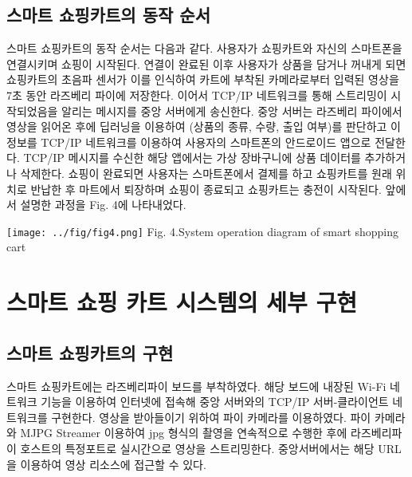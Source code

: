 \documentclass[smallextended]{svjour3}       %
\begin{document}
\hypertarget{uxc2a4uxb9c8uxd2b8-uxc1fcuxd551uxce74uxd2b8uxc758-uxb3d9uxc791-uxc21cuxc11c}{%
\subsection{스마트 쇼핑카트의 동작
순서}\label{uxc2a4uxb9c8uxd2b8-uxc1fcuxd551uxce74uxd2b8uxc758-uxb3d9uxc791-uxc21cuxc11c}}

스마트 쇼핑카트의 동작 순서는 다음과 같다. 사용자가 쇼핑카트와 자신의
스마트폰을 연결시키며 쇼핑이 시작된다. 연결이 완료된 이후 사용자가
상품을 담거나 꺼내게 되면 쇼핑카트의 초음파 센서가 이를 인식하여 카트에
부착된 카메라로부터 입력된 영상을 7초 동안 라즈베리 파이에 저장한다.
이어서 TCP/IP 네트워크를 통해 스트리밍이 시작되었음을 알리는 메시지를
중앙 서버에게 송신한다. 중앙 서버는 라즈베리 파이에서 영상을 읽어온 후에
딥러닝을 이용하여 (상품의 종류, 수량, 출입 여부)를 판단하고 이 정보를
TCP/IP 네트워크를 이용하여 사용자의 스마트폰의 안드로이드 앱으로
전달한다. TCP/IP 메시지를 수신한 해당 앱에서는 가상 장바구니에 상품
데이터를 추가하거나 삭제한다. 쇼핑이 완료되면 사용자는 스마트폰에서
결제를 하고 쇼핑카트를 원래 위치로 반납한 후 마트에서 퇴장하며 쇼핑이
종료되고 쇼핑카트는 충전이 시작된다. 앞에서 설명한 과정을 Fig. 4에
나타내었다.

\texttt{[image: ../fig/fig4.png]} Fig. 4.System operation diagram of
smart shopping cart

\hypertarget{uxc2a4uxb9c8uxd2b8-uxc1fcuxd551-uxce74uxd2b8-uxc2dcuxc2a4uxd15cuxc758-uxc138uxbd80-uxad6cuxd604}{%
\section{스마트 쇼핑 카트 시스템의 세부
구현}\label{uxc2a4uxb9c8uxd2b8-uxc1fcuxd551-uxce74uxd2b8-uxc2dcuxc2a4uxd15cuxc758-uxc138uxbd80-uxad6cuxd604}}

\hypertarget{uxc2a4uxb9c8uxd2b8-uxc1fcuxd551uxce74uxd2b8uxc758-uxad6cuxd604}{%
\subsection{스마트 쇼핑카트의
구현}\label{uxc2a4uxb9c8uxd2b8-uxc1fcuxd551uxce74uxd2b8uxc758-uxad6cuxd604}}

스마트 쇼핑카트에는 라즈베리파이 보드를 부착하였다. 해당 보드에 내장된
Wi-Fi 네트워크 기능을 이용하여 인터넷에 접속해 중앙 서버와의 TCP/IP
서버-클라이언트 네트워크를 구현한다. 영상을 받아들이기 위하여 파이
카메라를 이용하였다. 파이 카메라와 MJPG Streamer 이용하여 jpg 형식의
촬영을 연속적으로 수행한 후에 라즈베리파이 호스트의 특정포트로
실시간으로 영상을 스트리밍한다. 중앙서버에서는 해당 URL을 이용하여 영상
리소스에 접근할 수 있다.
\end{document}
